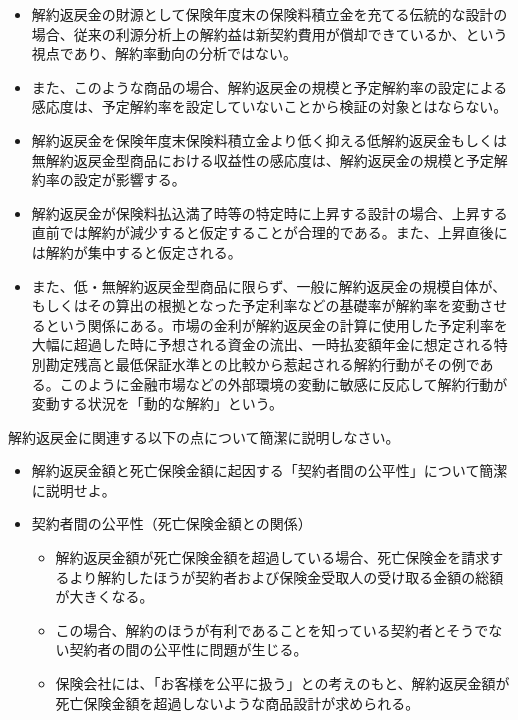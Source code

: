 \documentclass[report,gutter=10mm,fore-edge=10mm,uplatex,dvipdfmx]{jlreq}
\begin{document}
\begin{enumerate}
\begin{itemize}
  \item 解約返戻金の財源として保険年度末の保険料積立金を充てる伝統的な設計の場合、従来の利源分析上の解約益は新契約費用が償却できているか、という視点であり、解約率動向の分析ではない。
  \item また、このような商品の場合、解約返戻金の規模と予定解約率の設定による感応度は、予定解約率を設定していないことから検証の対象とはならない。
  \item 解約返戻金を保険年度末保険料積立金より低く抑える低解約返戻金もしくは無解約返戻金型商品における収益性の感応度は、解約返戻金の規模と予定解約率の設定が影響する。
  \item 解約返戻金が保険料払込満了時等の特定時に上昇する設計の場合、上昇する直前では解約が減少すると仮定することが合理的である。また、上昇直後には解約が集中すると仮定される。
  \item また、低・無解約返戻金型商品に限らず、一般に解約返戻金の規模自体が、もしくはその算出の根拠となった予定利率などの基礎率が解約率を変動させるという関係にある。市場の金利が解約返戻金の計算に使用した予定利率を大幅に超過した時に予想される資金の流出、一時払変額年金に想定される特別勘定残高と最低保証水準との比較から惹起される解約行動がその例である。このように金融市場などの外部環境の変動に敏感に反応して解約行動が変動する状況を「動的な解約」という。
  \end{itemize}
\end{enumerate} 
解約返戻金に関連する以下の点について簡潔に説明しなさい。
\begin{itemize}
\item 解約返戻金額と死亡保険金額に起因する「契約者間の公平性」について簡潔に説明せよ。
\end{itemize}

\begin{itemize}
\item 契約者間の公平性（死亡保険金額との関係）
  \begin{itemize}
  \item 解約返戻金額が死亡保険金額を超過している場合、死亡保険金を請求するより解約したほうが契約者および保険金受取人の受け取る金額の総額が大きくなる。
  \item この場合、解約のほうが有利であることを知っている契約者とそうでない契約者の間の公平性に問題が生じる。
  \item 保険会社には、「お客様を公平に扱う」との考えのもと、解約返戻金額が死亡保険金額を超過しないような商品設計が求められる。  
  \end{itemize}
\end{itemize}
\end{document}
